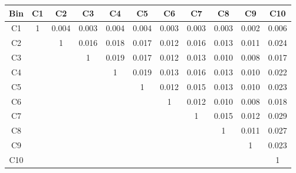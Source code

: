 \begin{tabular}{c@{~~~}c@{~~}c@{~~}c@{~~}c@{~~}c@{~~}c@{~~}c@{~~}c@{~~}c@{~~}c}
\hline
 \hline
Bin	& C1 & C2 & C3 & C4 & C5 & C6 & C7 & C8 & C9 & C10 \\
\hline
C1	&  1 &  0.004 &  0.003 &  0.004 &  0.004 &  0.003 &  0.003 &  0.003 &  0.002 &  0.006 \\
C2	&   &  1 &  0.016 &  0.018 &  0.017 &  0.012 &  0.016 &  0.013 &  0.011 &  0.024 \\
C3	&   &   &  1 &  0.019 &  0.017 &  0.012 &  0.013 &  0.010 &  0.008 &  0.017 \\
C4	&   &   &   &  1 &  0.019 &  0.013 &  0.016 &  0.013 &  0.010 &  0.022 \\
C5	&   &   &   &   &  1 &  0.012 &  0.015 &  0.013 &  0.010 &  0.023 \\
C6	&   &   &   &   &   &  1 &  0.012 &  0.010 &  0.008 &  0.018 \\
C7	&   &   &   &   &   &   &  1 &  0.015 &  0.012 &  0.029 \\
C8	&   &   &   &   &   &   &   &  1 &  0.011 &  0.027 \\
C9	&   &   &   &   &   &   &   &   &  1 &  0.023 \\
C10	&   &   &   &   &   &   &   &   &   &  1 \\
\hline
 \hline
\end{tabular}
